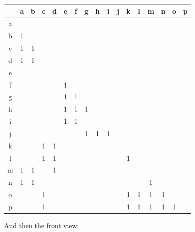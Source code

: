 \documentclass[
11pt, %
english, %
singlespacing, %
headsepline, %
]{MastersDoctoralThesis} %
\begin{document}
\begin{center}
\begin{tabular}[width = \textwidth]{ |c|c|c|c|c|c|c|c|c|c|c|c|c|c|c|c|c| } 
\hline
  & a & b & c & d & e & f & g & h & i & j & k & l & m & n & o & p \\ \hline \hline
a &   &   &   &   &   &   &   &   &   &   &   &   &   &   &   &   \\ \hline
b & 1 &   &   &   &   &   &   &   &   &   &   &   &   &   &   &   \\ \hline
c & 1 & 1 &   &   &   &   &   &   &   &   &   &   &   &   &   &   \\ \hline
d & 1 & 1 &   &   &   &   &   &   &   &   &   &   &   &   &   &   \\ \hline
e &   &   &   &   &   &   &   &   &   &   &   &   &   &   &   &   \\ \hline
f &   &   &   &   & 1 &   &   &   &   &   &   &   &   &   &   &   \\ \hline
g &   &   &   &   & 1 & 1 &   &   &   &   &   &   &   &   &   &   \\ \hline
h &   &   &   &   & 1 & 1 & 1 &   &   &   &   &   &   &   &   &   \\ \hline 
i &   &   &   &   & 1 & 1 &   &   &   &   &   &   &   &   &   &   \\ \hline
j &   &   &   &   &   &   & 1 & 1 & 1 &   &   &   &   &   &   &   \\ \hline
k &   &   & 1 & 1 &   &   &   &   &   &   &   &   &   &   &   &   \\ \hline
l &   &   & 1 & 1 &   &   &   &   &   &   & 1 &   &   &   &   &   \\ \hline
m & 1 & 1 &   & 1 &   &   &   &   &   &   &   &   &   &   &   &   \\ \hline
n & 1 & 1 &   &   &   &   &   &   &   &   &   &   & 1 &   &   &   \\ \hline
o &   &   & 1 &   &   &   &   &   &   &   & 1 & 1 & 1 & 1 &   &   \\ \hline
p &   &   & 1 &   &   &   &   &   &   &   & 1 & 1 & 1 & 1 & 1 &   \\ \hline
\hline
\end{tabular}
\end{center}
\pagebreak
And then the front view:
\end{document}
